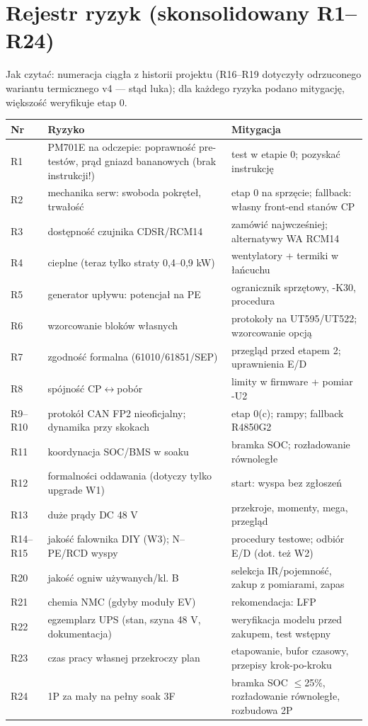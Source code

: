 \documentclass[11pt,a4paper]{article}
\begin{document}
\section{Rejestr ryzyk (skonsolidowany R1--R24)}
Jak czytać: numeracja ciągła z historii projektu (R16--R19 dotyczyły odrzuconego wariantu
termicznego v4 --- stąd luka); dla każdego ryzyka podano mitygację, większość weryfikuje etap 0.
\begin{longtable}{@{}p{}p{}p{}@{}}
\toprule
\textbf{Nr} & \textbf{Ryzyko} & \textbf{Mitygacja}\\
\midrule
R1 & PM701E na odczepie: poprawność pre-testów, prąd gniazd bananowych (brak instrukcji!) & test w etapie 0; pozyskać instrukcję\\
R2 & mechanika serw: swoboda pokręteł, trwałość & etap 0 na sprzęcie; fallback: własny front-end stanów CP\\
R3 & dostępność czujnika CDSR/RCM14 & zamówić najwcześniej; alternatywy WA RCM14\\
R4 & cieplne (teraz tylko straty 0,4--0,9 kW) & wentylatory + termiki w łańcuchu\\
R5 & generator upływu: potencjał na PE & ogranicznik sprzętowy, -K30, procedura\\
R6 & wzorcowanie bloków własnych & protokoły na UT595/UT522; wzorcowanie opcją\\
R7 & zgodność formalna (61010/61851/SEP) & przegląd przed etapem 2; uprawnienia E/D\\
R8 & spójność CP$\leftrightarrow$pobór & limity w firmware + pomiar -U2\\
R9--R10 & protokół CAN FP2 nieoficjalny; dynamika przy skokach & etap 0(c); rampy; fallback R4850G2\\
R11 & koordynacja SOC/BMS w soaku & bramka SOC; rozładowanie równoległe\\
R12 & formalności oddawania (dotyczy tylko upgrade W1) & start: wyspa bez zgłoszeń\\
R13 & duże prądy DC 48 V & przekroje, momenty, mega, przegląd\\
R14--R15 & jakość falownika DIY (W3); N--PE/RCD wyspy & procedury testowe; odbiór E/D (dot. też W2)\\
R20 & jakość ogniw używanych/kl. B & selekcja IR/pojemność, zakup z pomiarami, zapas\\
R21 & chemia NMC (gdyby moduły EV) & rekomendacja: LFP\\
R22 & egzemplarz UPS (stan, szyna 48 V, dokumentacja) & weryfikacja modelu przed zakupem, test wstępny\\
R23 & czas pracy własnej przekroczy plan & etapowanie, bufor czasowy, przepisy krok-po-kroku\\
R24 & 1P za mały na pełny soak 3F & bramka SOC $\le$25\%, rozładowanie równoległe, rozbudowa 2P\\
\bottomrule
\end{longtable}
\end{document}

